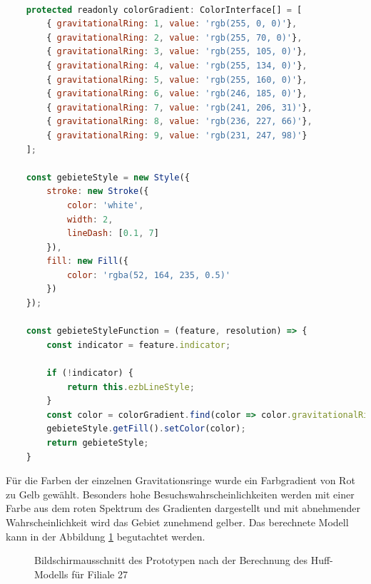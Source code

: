 \begin{lstlisting}[language=JavaScript, caption={Einfärben der Gebiete}]
	
	protected readonly colorGradient: ColorInterface[] = [
		{ gravitationalRing: 1, value: 'rgb(255, 0, 0)'},
		{ gravitationalRing: 2, value: 'rgb(255, 70, 0)'},
		{ gravitationalRing: 3, value: 'rgb(255, 105, 0)'},
		{ gravitationalRing: 4, value: 'rgb(255, 134, 0)'},
		{ gravitationalRing: 5, value: 'rgb(255, 160, 0)'},
		{ gravitationalRing: 6, value: 'rgb(246, 185, 0)'},
		{ gravitationalRing: 7, value: 'rgb(241, 206, 31)'},
		{ gravitationalRing: 8, value: 'rgb(236, 227, 66)'},
		{ gravitationalRing: 9, value: 'rgb(231, 247, 98)'}
	];
	
	const gebieteStyle = new Style({
		stroke: new Stroke({
			color: 'white',
			width: 2,
			lineDash: [0.1, 7]
		}),
		fill: new Fill({
			color: 'rgba(52, 164, 235, 0.5)'
		})
	});

	const gebieteStyleFunction = (feature, resolution) => {
		const indicator = feature.indicator;
		
		if (!indicator) {
			return this.ezbLineStyle;
		}
		const color = colorGradient.find(color => color.gravitationalRing === indicator).value;
		gebieteStyle.getFill().setColor(color);
		return gebieteStyle;
	}
\end{lstlisting}

Für die Farben der einzelnen Gravitationsringe wurde ein Farbgradient von Rot zu Gelb gewählt.
Besonders hohe Besuchswahrscheinlichkeiten werden mit einer Farbe aus dem roten Spektrum des Gradienten dargestellt und mit abnehmender Wahrscheinlichkeit wird das Gebiet zunehmend gelber.
Das berechnete Modell kann in der Abbildung \ref{img:calc_modell} begutachtet werden.

\begin{figure}[H]
	\caption{Bildschirmausschnitt des Prototypen nach der Berechnung des Huff-Modells für Filiale 27}
	\label{img:calc_modell}
\end{figure}
